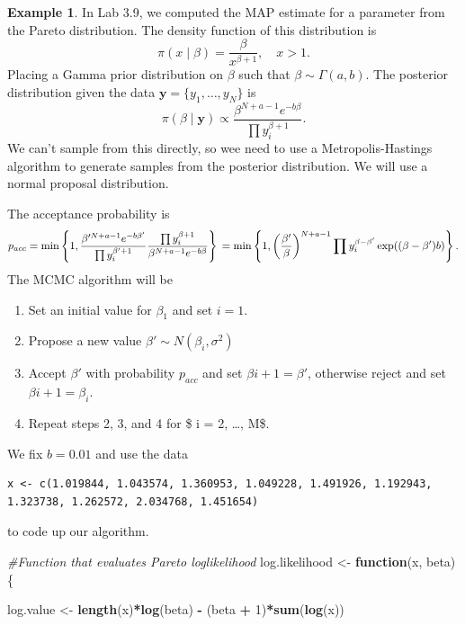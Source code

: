\documentclass[
]{book}
\newenvironment{Shaded}{\begin{snugshade}}{\end{snugshade}}
\newcommand{\CommentTok}[1]{\textcolor[rgb]{0.56,0.35,0.01}{\textit{#1}}}
\newcommand{\ControlFlowTok}[1]{\textcolor[rgb]{0.13,0.29,0.53}{\textbf{#1}}}
\newcommand{\DecValTok}[1]{\textcolor[rgb]{0.00,0.00,0.81}{#1}}
\newcommand{\FunctionTok}[1]{\textcolor[rgb]{0.13,0.29,0.53}{\textbf{#1}}}
\newcommand{\NormalTok}[1]{#1}
\newcommand{\OtherTok}[1]{\textcolor[rgb]{0.56,0.35,0.01}{#1}}
\newcommand{\SpecialCharTok}[1]{\textcolor[rgb]{0.81,0.36,0.00}{\textbf{#1}}}
\providecommand{\tightlist}{%
  \setlength{\itemsep}{0pt}\setlength{\parskip}{0pt}}
\theoremstyle{definition}
\theoremstyle{definition}
\newtheorem{example}{Example}[chapter]
\theoremstyle{definition}
\theoremstyle{definition}
\theoremstyle{remark}
\begin{document}
\begin{example}
In Lab 3.9, we computed the MAP estimate for a parameter from the Pareto distribution. The density function of this distribution is
\[
\pi(x \mid \beta) = \frac{\beta}{x^{\beta + 1}}, \quad x > 1. 
\]
Placing a Gamma prior distribution on \(\beta\) such that \(\beta \sim \Gamma(a, b)\). The posterior distribution given the data \(\boldsymbol{y} = \{y_1, \ldots, y_N\}\) is
\[
\pi(\beta \mid \boldsymbol{y}) \propto \frac{\beta^{N + a - 1}e^{-b\beta}}{\prod y_i^{\beta + 1}}.
\]
We can't sample from this directly, so wee need to use a Metropolis-Hastings algorithm to generate samples from the posterior distribution. We will use a normal proposal distribution.

The acceptance probability is
\[
p_{acc} = \min \left\{1, \frac{\beta'^{N + a - 1}e^{-b\beta'}}{\prod y_i^{\beta' + 1}}\frac{\prod y_i^{\beta + 1}}{\beta^{N + a - 1}e^{-b\beta}} \right\} \\
= \min \left\{1, \left(\frac{\beta'}{\beta}\right)^{N + a - 1}{\prod y_i^{\beta - \beta'}}\exp((\beta - \beta')b) \right\}. 
\]
The MCMC algorithm will be

\begin{enumerate}
\def\labelenumi{\arabic{enumi}.}
\tightlist
\item
  Set an initial value for \(\beta_1\) and set \(i =1\).
\item
  Propose a new value \(\beta' \sim N(\beta_i, \sigma^2)\)
\item
  Accept \(\beta'\) with probability \(p_{acc}\) and set \(\beta{i+1}= \beta'\), otherwise reject and set\(\beta{i+1}= \beta_i\).
\item
  Repeat steps 2, 3, and 4 for \$ i = 2, \ldots, M\$.
\end{enumerate}

We fix \(b=0.01\) and use the data

\begin{verbatim}
x <- c(1.019844, 1.043574, 1.360953, 1.049228, 1.491926, 1.192943, 1.323738, 1.262572, 2.034768, 1.451654)
\end{verbatim}

to code up our algorithm.

\begin{Shaded}
\begin{Highlighting}[]
\CommentTok{\#Function that evaluates Pareto loglikelihood}
\NormalTok{log.likelihood }\OtherTok{\textless{}{-}} \ControlFlowTok{function}\NormalTok{(x, beta)\{}

\NormalTok{  log.value }\OtherTok{\textless{}{-}} \FunctionTok{length}\NormalTok{(x)}\SpecialCharTok{*}\FunctionTok{log}\NormalTok{(beta) }\SpecialCharTok{{-}}\NormalTok{ (beta }\SpecialCharTok{+} \DecValTok{1}\NormalTok{)}\SpecialCharTok{*}\FunctionTok{sum}\NormalTok{(}\FunctionTok{log}\NormalTok{(x))}


\end{Highlighting}
\end{Shaded}
\end{example}
\end{document}
